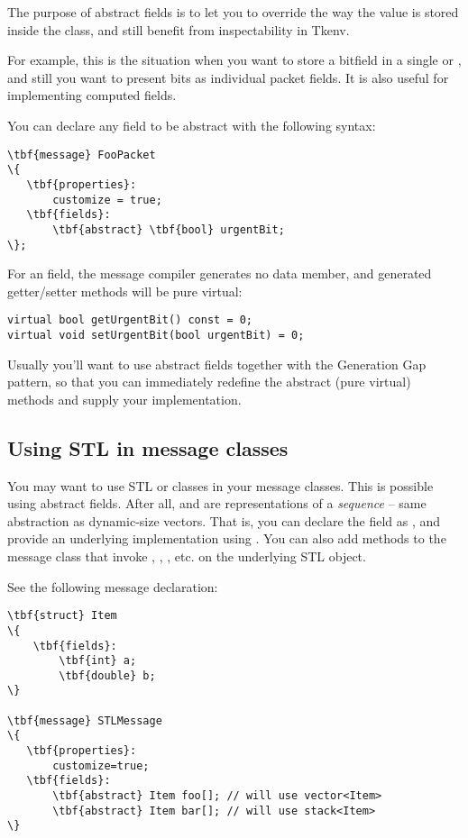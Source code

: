 The purpose of abstract fields is to let you to override
the way the value is stored inside the class,
and still benefit from inspectability in Tkenv.

For example, this is the situation when you want to store a bitfield
in a single  or , and still you want
to present bits as individual packet fields.
It is also useful for implementing computed fields.

You can declare any field to be abstract with the following syntax:

\begin{Verbatim}[commandchars=\\\{\}]
\tbf{message} FooPacket
\{
   \tbf{properties}:
       customize = true;
   \tbf{fields}:
       \tbf{abstract} \tbf{bool} urgentBit;
\};
\end{Verbatim}

For an  field, the message compiler generates
no data member, and generated getter/setter methods will be pure
virtual:

\begin{verbatim}
virtual bool getUrgentBit() const = 0;
virtual void setUrgentBit(bool urgentBit) = 0;
\end{verbatim}


Usually you'll want to use abstract fields together with
the Generation Gap pattern, so that you can immediately
redefine the abstract (pure virtual) methods and
supply your implementation.



\subsection{Using STL in message classes}

You may want to use STL  or  classes in your message classes.
This is possible using abstract fields. After all,  and 
are representations of a \textit{sequence} -- same abstraction as dynamic-size vectors.
That is, you can declare the field as , and provide
an underlying implementation using . You can also add methods
to the message class that invoke , , , etc.
on the underlying STL object.

See the following message declaration:

\begin{Verbatim}[commandchars=\\\{\}]
\tbf{struct} Item
\{
    \tbf{fields}:
        \tbf{int} a;
        \tbf{double} b;
\}

\tbf{message} STLMessage
\{
   \tbf{properties}:
       customize=true;
   \tbf{fields}:
       \tbf{abstract} Item foo[]; // will use vector<Item>
       \tbf{abstract} Item bar[]; // will use stack<Item>
\}
\end{Verbatim}

